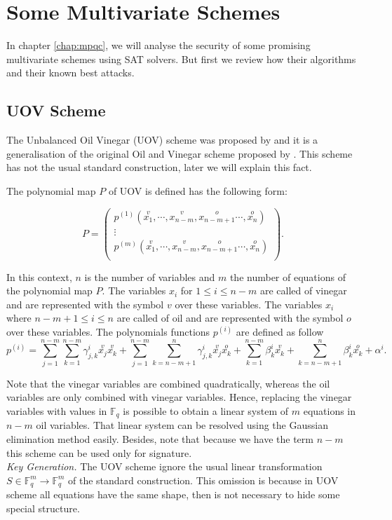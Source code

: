 \chapter{{Some Multivariate Schemes}}
\label{chapter:back_ground_mpqc}
In chapter \ref{chap:mpqc}, we will analyse the security of some promising multivariate schemes using SAT solvers. But first we review how their algorithms and their known best attacks. 
\section{UOV Scheme}
The Unbalanced Oil Vinegar (UOV) scheme was proposed by \citet{Kipnis1999} and it is a generalisation of the original Oil and Vinegar scheme proposed by \citet{Patarin1997}. This scheme has not the usual standard construction, later we will explain this fact.

The polynomial map $P$ of UOV is defined has the following form:

\begin{equation}
 P=\left(\begin{matrix}
    p^{(1)}(\overset{v}{x_1},\cdots,\overset{v}{x_{n-m}},\overset{o}{x_{n-m+1}} \cdots,\overset{o}{x_n})  \\   
    \vdots \\
p^{(m)}(\overset{v}{x_1},\cdots,\overset{v}{x_{n-m}},\overset{o}{x_{n-m+1}} \cdots,\overset{o}{x_n})  \\ 
   \end{matrix}\right).
\label{eq:uov}
\end{equation}

In this context, $n$ is the number of variables and $m$ the number of equations of the polynomial map $P$. The variables $x_i$ for $1 \leq i \leq n-m$ are called of vinegar and are represented with the symbol $v$ over these variables. The variables $x_i$ where $n-m + 1 \leq i \leq n$ are called of oil and are represented with the symbol $o$ over these variables. The polynomials functions $p^{(i)}$ are defined as follow
$$p^{(i)} =\displaystyle\sum_{j=1}^{n-m}\displaystyle\sum_{k=1}^{n-m} \gamma_{j,k}^{i}\overset{v}{x_j}\overset{v}{x_k}+\displaystyle\sum_{j=1}^{n-m}\displaystyle\sum_{k=n-m+1}^{n} \gamma_{j,k}^{i}\overset{v}{x_j}\overset{o}{x_k}+\displaystyle\sum_{k=1}^{n-m} \beta_{k}^{i}\overset{v}{x_k}+\displaystyle\sum_{k=n-m+1}^{n} \beta_{k}^{i}\overset{o}{x_k}+\alpha^i.$$

Note that the vinegar variables are combined quadratically, whereas the oil variables are only combined with vinegar variables. Hence, replacing the vinegar variables with values in $\mathbb{F}_q$ is possible to obtain a linear system of $m$ equations in $n-m$ oil variables. That linear system can be resolved using the Gaussian elimination method easily. Besides, note that because we have the term $n-m$ this scheme can be used only for signature.\\
\noindent
\textit{Key Generation.} The UOV scheme ignore the usual linear transformation $S\in \mathbb{F}_q^m\rightarrow \mathbb{F}_q^m$ of the standard construction. This omission is because in UOV scheme all equations have the same shape, then is not necessary to hide some special structure. 

